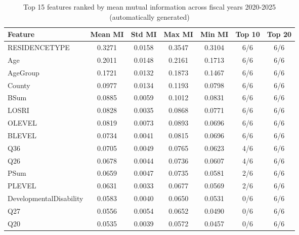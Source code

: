 \begin{table}[htbp]
\centering
\caption{Top 15 features ranked by mean mutual information across fiscal years 2020-2025 (automatically generated)}
\label{tab:top-features-mi}
\small
\begin{tabular}{lcccccc}
\hline
\textbf{Feature} & \textbf{Mean MI} & \textbf{Std MI} & \textbf{Max MI} & \textbf{Min MI} & \textbf{Top 10} & \textbf{Top 20} \\
\hline
RESIDENCETYPE & 0.3271 & 0.0158 & 0.3547 & 0.3104 & 6/6 & 6/6 \\
Age & 0.2011 & 0.0148 & 0.2161 & 0.1713 & 6/6 & 6/6 \\
AgeGroup & 0.1721 & 0.0132 & 0.1873 & 0.1467 & 6/6 & 6/6 \\
County & 0.0977 & 0.0134 & 0.1193 & 0.0798 & 6/6 & 6/6 \\
BSum & 0.0885 & 0.0059 & 0.1012 & 0.0831 & 6/6 & 6/6 \\
LOSRI & 0.0828 & 0.0035 & 0.0868 & 0.0771 & 6/6 & 6/6 \\
OLEVEL & 0.0819 & 0.0073 & 0.0893 & 0.0696 & 6/6 & 6/6 \\
BLEVEL & 0.0734 & 0.0041 & 0.0815 & 0.0696 & 6/6 & 6/6 \\
Q36 & 0.0705 & 0.0049 & 0.0765 & 0.0623 & 4/6 & 6/6 \\
Q26 & 0.0678 & 0.0044 & 0.0736 & 0.0607 & 4/6 & 6/6 \\
PSum & 0.0659 & 0.0047 & 0.0735 & 0.0581 & 2/6 & 6/6 \\
PLEVEL & 0.0631 & 0.0033 & 0.0677 & 0.0569 & 2/6 & 6/6 \\
DevelopmentalDisability & 0.0583 & 0.0040 & 0.0650 & 0.0531 & 0/6 & 6/6 \\
Q27 & 0.0556 & 0.0054 & 0.0652 & 0.0490 & 0/6 & 6/6 \\
Q20 & 0.0535 & 0.0039 & 0.0572 & 0.0457 & 0/6 & 6/6 \\
\hline
\end{tabular}
\end{table}
